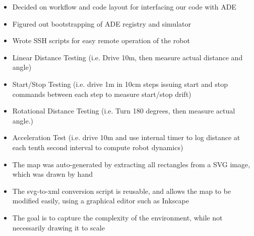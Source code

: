 \documentclass[12pt]{article}
\begin{document}
\begin{itemize}
    \setlength{\itemsep}{0pt}
    \setlength{\parskip}{0pt}
    \setlength{\parsep}{0pt}
    \item Decided on workflow and code layout for interfacing our code with ADE
    \item Figured out bootstrapping of ADE registry and simulator
    \item Wrote SSH scripts for easy remote operation of the robot
\end{itemize}

\begin{itemize}
    \setlength{\itemsep}{0pt}
    \setlength{\parskip}{0pt}
    \setlength{\parsep}{0pt}
    \item Linear Distance Testing (i.e. Drive 10m, then measure actual
      distance and angle)
    \item Start/Stop Testing (i.e. drive 1m in 10cm steps issuing
      start and stop commands between each step to measure start/stop drift)
    \item Rotational Distance Testing (i.e. Turn 180 degrees, then measure
      actual angle.)
    \item Acceleration Test (i.e. drive 10m and use internal timer to log
      distance at each tenth second interval to compute robot dynamics)
\end{itemize}

\begin{itemize}
    \setlength{\itemsep}{0pt}
    \setlength{\parskip}{0pt}
    \setlength{\parsep}{0pt}
    \item The map was auto-generated by extracting all rectangles from a SVG
          image, which was drawn by hand
    \item The svg-to-xml conversion script is reusable, and allows the map to be
          modified easily, using a graphical editor such as Inkscape
    \item The goal is to capture the complexity of the environment, while not
          necessarily drawing it to scale
\end{itemize}
\end{document}
